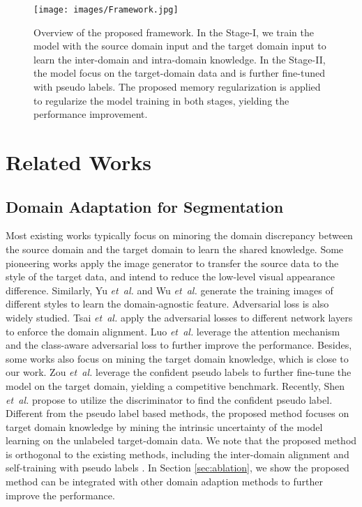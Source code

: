 \documentclass{article}
\def\etal{\emph{et~al.}}
\begin{document}
\begin{figure*}[t]
\begin{center}
     \texttt{[image: images/Framework.jpg]}
\end{center}
\vspace{-.15in}
      \caption{Overview of the proposed framework. In the Stage-I, we train the model with the source domain input  and the target domain input  to learn the inter-domain and intra-domain knowledge. In the Stage-II, the model focus on the target-domain data and is further fine-tuned with pseudo labels. The proposed memory regularization  is applied to regularize the model training in both stages, yielding the performance improvement. 
      }\label{fig:framework}
\end{figure*}

\section{Related Works}
\subsection{Domain Adaptation for Segmentation}
Most existing works typically focus on minoring the domain discrepancy between the source domain and the target domain to learn the shared knowledge. Some pioneering works \cite{hoffman2018cycada,wu2018dcan} apply the image generator to  transfer the source data to the style of the target data, and intend to reduce the low-level visual appearance difference. Similarly, Yu \etal \cite{yue2019domain} and Wu \etal \cite{wu2019ace} generate the training images of different styles to learn the domain-agnostic feature. Adversarial loss is also widely studied. Tsai \etal \cite{tsai2018learning,tsai2019domain} apply the adversarial losses to different network layers to enforce the domain alignment. Luo \etal \cite{luo2019taking} leverage the attention mechanism and the class-aware adversarial loss to further improve the performance. 
Besides, some works also focus on mining the target domain knowledge, which is close to our work. Zou \etal \cite{zou2018unsupervised,zou2019confidence} leverage the confident pseudo labels to further fine-tune the model on the target domain, yielding a competitive benchmark. Recently, Shen \etal \cite{shen2019regularizing} propose to  utilize the discriminator to find the confident pseudo label. Different from the pseudo label based methods, the proposed method focuses on target domain knowledge by mining the intrinsic uncertainty of the model learning on the unlabeled target-domain data. We note that the proposed method is orthogonal to the existing methods, including the inter-domain alignment \cite{tsai2018learning,tsai2019domain,luo2019taking} and self-training with pseudo labels \cite{zou2018unsupervised,zou2019confidence}. In Section \ref{sec:ablation}, we show the proposed method can be integrated with other domain adaption methods to further improve the performance. 
\end{document}

